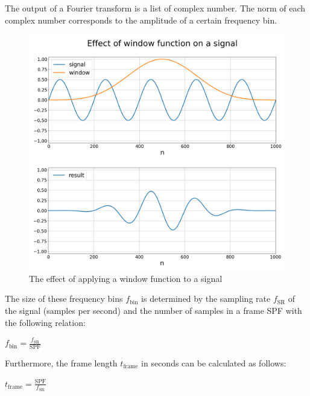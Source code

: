 \documentclass[10pt,twocolumn]{article}
\begin{document}
The output of a Fourier transform is a list of complex number. The norm of each complex number corresponds to the amplitude of a certain frequency bin.
\begin{figure}[H]%
    \centering
    \includegraphics[width=\linewidth]{3.png} %
    \caption{The effect of applying a window function to a signal}
    \label{fig:spec}
\end{figure}%
\noindent The size of these frequency bins $f_{\text{bin}}$ is determined by the sampling rate $f_{\text{SR}}$ of the signal (samples per second) and the number of samples in a frame SPF with the following relation:
\begin{center}
    $f_{\text{bin}} = \frac{f_{\text{SR}}}{\text{SPF}}$
\end{center}
Furthermore, the frame length $t_\text{frame}$ in seconds can be calculated as follows:
\begin{center}
    $t_{\text{frame}} = \frac{\text{SPF}}{f_{\text{SR}}}$
\end{center}
\end{document}
